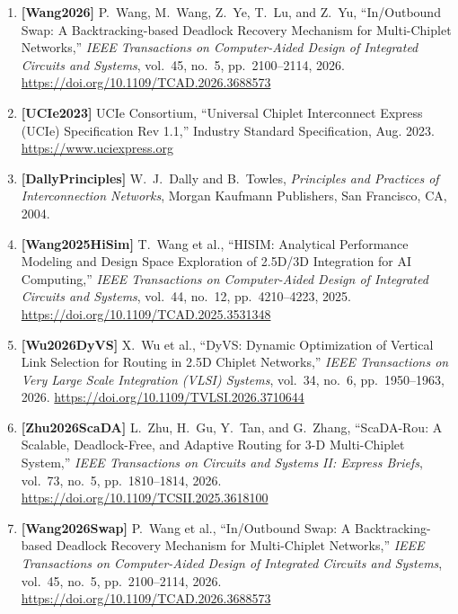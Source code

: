 \begin{enumerate}
    \item \textbf{[Wang2026]} P.~Wang, M.~Wang, Z.~Ye, T.~Lu, and Z.~Yu, ``In/Outbound Swap: A Backtracking-based Deadlock Recovery Mechanism for Multi-Chiplet Networks,'' \emph{IEEE Transactions on Computer-Aided Design of Integrated Circuits and Systems}, vol.~45, no.~5, pp.~2100--2114, 2026. \url{https://doi.org/10.1109/TCAD.2026.3688573}
    \item \textbf{[UCIe2023]} {UCIe Consortium}, ``Universal Chiplet Interconnect Express (UCIe) Specification Rev 1.1,'' Industry Standard Specification, Aug. 2023. \url{https://www.uciexpress.org}
    \item \textbf{[DallyPrinciples]} W.~J.~Dally and B.~Towles, \emph{Principles and Practices of Interconnection Networks}, Morgan Kaufmann Publishers, San Francisco, CA, 2004.
    \item \textbf{[Wang2025HiSim]} T.~Wang et al., ``HISIM: Analytical Performance Modeling and Design Space Exploration of 2.5D/3D Integration for AI Computing,'' \emph{IEEE Transactions on Computer-Aided Design of Integrated Circuits and Systems}, vol.~44, no.~12, pp.~4210--4223, 2025. \url{https://doi.org/10.1109/TCAD.2025.3531348}
    \item \textbf{[Wu2026DyVS]} X.~Wu et al., ``DyVS: Dynamic Optimization of Vertical Link Selection for Routing in 2.5D Chiplet Networks,'' \emph{IEEE Transactions on Very Large Scale Integration (VLSI) Systems}, vol.~34, no.~6, pp.~1950--1963, 2026. \url{https://doi.org/10.1109/TVLSI.2026.3710644}
    \item \textbf{[Zhu2026ScaDA]} L.~Zhu, H.~Gu, Y.~Tan, and G.~Zhang, ``ScaDA-Rou: A Scalable, Deadlock-Free, and Adaptive Routing for 3-D Multi-Chiplet System,'' \emph{IEEE Transactions on Circuits and Systems II: Express Briefs}, vol.~73, no.~5, pp.~1810--1814, 2026. \url{https://doi.org/10.1109/TCSII.2025.3618100}
    \item \textbf{[Wang2026Swap]} P.~Wang et al., ``In/Outbound Swap: A Backtracking-based Deadlock Recovery Mechanism for Multi-Chiplet Networks,'' \emph{IEEE Transactions on Computer-Aided Design of Integrated Circuits and Systems}, vol.~45, no.~5, pp.~2100--2114, 2026. \url{https://doi.org/10.1109/TCAD.2026.3688573}
\end{enumerate}
